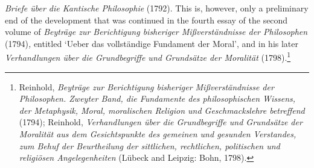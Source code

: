 \textit{Briefe \"{u}ber die Kantische Philosophie} (1792). This is, however, only a preliminary end of the development that was continued in the fourth essay of the second volume of \textit{Beytr\"{a}ge zur Berichtigung bisheriger Mi\ss{}verst\"{a}ndnisse der Philosophen} (1794)\textit{,} entitled `Ueber das vollst\"{a}ndige Fundament der Moral', and in his later \textit{Verhandlungen \"{u}ber die Grundbegriffe und Grunds\"{a}tze der Moralit\"{a}t }(1798).\footnote{ Reinhold, \textit{Beytr\"{a}ge zur Berichtigung bisheriger Mi\ss{}verst\"{a}ndnisse der Philosophen. Zweyter Band, die Fundamente des philosophischen Wissens, der Metaphysik, Moral, moralischen Religion und Geschmackslehre betreffend }(1794); Reinhold, \textit{Verhandlungen \"{u}ber die Grundbegriffe und Grunds\"{a}tze der Moralit\"{a}t aus dem Gesichtspunkte des gemeinen und gesunden Verstandes, zum Behuf der Beurtheilung der sittlichen, rechtlichen, politischen und religi\"{o}sen Angelegenheiten} (L\"{u}beck and Leipzig: Bohn, 1798).}

